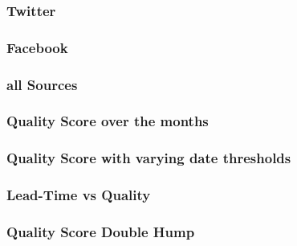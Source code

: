 \documentclass{beamer}
\begin{document}
\begin{frame}
    \frametitle{Twitter}
\end{frame}

\begin{frame}
    \frametitle{Facebook}
\end{frame}

\begin{frame}
    \frametitle{all Sources}
\end{frame}

\begin{frame}
    \frametitle{Quality Score over the months}
\end{frame}

\begin{frame}
    \frametitle{Quality Score with varying date thresholds }
\end{frame}

\begin{frame}
    \frametitle{Lead-Time vs Quality}
\end{frame}

\begin{frame}
    \frametitle{Quality Score Double Hump}
\end{frame}
\end{document}
